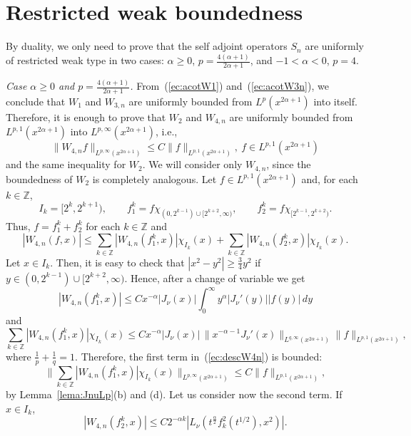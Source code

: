 \documentclass{amsart}
\theoremstyle{plain}
\newcommand{\Z}{\mathbb{Z}}
\begin{document}
\section{Restricted weak boundedness}

By duality, we only need to prove that the self adjoint operators $S_n$ are
uniformly of restricted weak type in two cases: $\alpha \geq 0$, $p =
\frac{4(\alpha+1)}{2\alpha+1}$, and $-1 < \alpha < 0$, $p = 4$.

{\it Case $\alpha \ge0$ and $p = \frac{4(\alpha+1)}{2\alpha+1}$.}
From~(\ref{ec:acotW1}) and~(\ref{ec:acotW3n}), we conclude that $W_1$ and
$W_{3,n}$ are uniformly bounded from $L^p(x^{2\alpha+1})$ into itself.
Therefore, it is enough to prove that $W_2$ and $W_{4,n}$ are uniformly
bounded from
$L^{p,1}(x^{2\alpha+1})$ into $L^{p,\infty}(x^{2\alpha+1})$, i.e.,
\[
   \| W_{4,n} f \|_{L^{p,\infty}(x^{2\alpha+1})}
   \leq C \| f \|_{L^{p,1}(x^{2\alpha+1})},
   \ f \in L^{p,1}(x^{2\alpha+1})
\]
and the same inequality for $W_2$. We will consider only $W_{4,n}$,
since the boundedness of $W_2$ is completely analogous. Let $f \in
L^{p,1}(x^{2\alpha+1})$ and, for each $k \in \Z$,
\[
   I_k = [2^k, 2^{k+1}),
   \qquad
   f_1^k = f \chi_{(0,2^{k-1}) \cup [2^{k+2},\infty)},
   \qquad
   f_2^k = f \chi_{[2^{k-1},2^{k+2})}.
\]
Thus, $f = f_1^k + f_2^k$ for each $k \in \Z$ and
\begin{equation}
\label{ec:descW4n}
   |W_{4,n} (f,x)| 
   \leq \sum_{k \in \Z} |W_{4,n} (f_1^k,x)| \chi_{I_k}(x)
   + \sum_{k \in \Z} |W_{4,n} (f_2^k,x)| \chi_{I_k}(x).
\end{equation}
Let $x \in I_k$. Then, it is easy to
check that $|x^2 - y^2| \geq \frac{3}{4} y^2$ if $y \in (0,2^{k-1}) \cup
[2^{k+2},\infty)$. Hence, after a change of variable we get
\[
   |W_{4,n} (f_1^k,x)| 
   \leq C x^{-\alpha} |J_\nu(x)|
   \int_0^\infty y^{\alpha}
   |J_\nu'(y)| |f(y)| \, dy
\]
and
\[
   \sum_{k \in \Z} |W_{4,n} (f_1^k,x)| \chi_{I_k}(x)
   \leq C x^{-\alpha} |J_\nu(x)|\,
   \| x^{-\alpha-1} J_\nu'(x)
   \|_{L^{q,\infty}(x^{2\alpha+1})}
   \| f \|_{L^{p,1}(x^{2\alpha+1})},
\]
where $\frac{1}{p} + \frac{1}{q} = 1$. Therefore, the first term
in~(\ref{ec:descW4n}) is bounded:
\[
   \| \sum_{k \in \Z} |W_{4,n} (f_1^k,x)| \chi_{I_k}(x)
   \|_{L^{p,\infty}(x^{2\alpha+1})}
   \leq C \| f \|_{L^{p,1}(x^{2\alpha+1})},
\]
by Lemma~\ref{lema:JnuLp}(b) and (d).
Let us consider
now the second term. If $x \in I_k$,
\[
   |W_{4,n} (f_2^k,x)| 
   \leq C
   2^{-\alpha k} \left|L_\nu(t^\frac{\alpha}{2} f_k^2(t^{1/2}), x^2)
   \right|.
\]
\end{document}
